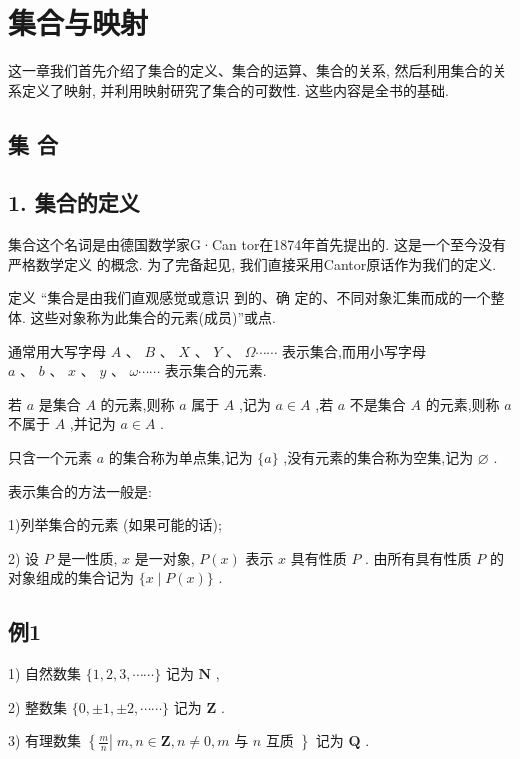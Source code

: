 

\chapter{集合与映射}

这一章我们首先介绍了集合的定义、集合的运算、集合的关系, 然后利用集合的关系定义了映射, 并利用映射研究了集合的可数性. 这些内容是全书的基础.

\section{集 合}

\section*{1. 集合的定义}

集合这个名词是由德国数学家G·Can tor在1874年首先提出的. 这是一个至今没有严格数学定义 的概念. 为了完备起见, 我们直接采用Cantor原话作为我们的定义.

定义 “集合是由我们直观感觉或意识 到的、确 定的、不同对象汇集而成的一个整体. 这些对象称为此集合的元素(成员)”或点.

通常用大写字母 $A\text{ 、 }B\text{ 、 }X\text{ 、 }Y\text{ 、 }\Omega \cdots \cdots$ 表示集合,而用小写字母 $a\text{ 、 }b\text{ 、 }x\text{ 、 }y\text{ 、 }\omega \cdots \cdots$ 表示集合的元素.

若 $a$ 是集合 $A$ 的元素,则称 $a$ 属于 $A$ ,记为 $a \in  A$ ,若 $a$ 不是集合 $A$ 的元素,则称 $a$ 不属于 $A$ ,并记为 $a \in  A$ .

只含一个元素 $a$ 的集合称为单点集,记为 $\{ a\}$ ,没有元素的集合称为空集,记为 $\varnothing$ .

表示集合的方法一般是:

1)列举集合的元素 (如果可能的话);

2) 设 $P$ 是一性质, $x$ 是一对象, $P\left( x\right)$ 表示 $x$ 具有性质 $P$ . 由所有具有性质 $P$ 的对象组成的集合记为 $\{ x \mid  P\left( x\right) \}$ .

\section*{例1}

1) 自然数集 $\{ 1,2,3,\cdots \cdots \}$ 记为 $\mathbf{N}$ ,

2) 整数集 $\{ 0, \pm  1, \pm  2,\cdots \cdots \}$ 记为 $\mathbf{Z}$ .

3) 有理数集 $\left\{  {\left. \frac{m}{n}\right| \;m,n \in  \mathbf{Z},n \neq  0,m\text{ 与 }n\text{ 互质 }}\right\}$ 记为 $\mathbf{Q}$ .

